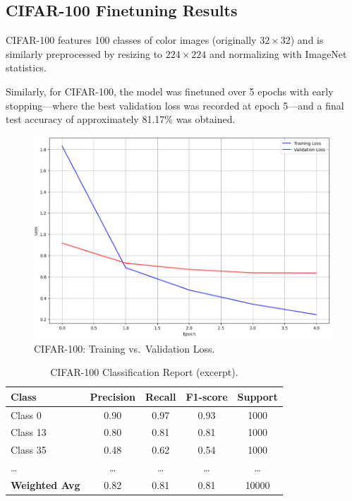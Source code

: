 \documentclass[conference]{IEEEtran}
\begin{document}
\subsection{CIFAR-100 Finetuning Results}
CIFAR-100 features 100 classes of color images (originally $32\times32$)
\cite{cifar} and is similarly preprocessed by resizing to $224\times224$ and
normalizing with ImageNet statistics.

Similarly, for CIFAR-100, the model was finetuned
over 5 epochs with early stopping—where the best validation loss was recorded
at epoch 5—and a final test accuracy of approximately 81.17\% was obtained.

\begin{figure}[H]
    \centering
    \includegraphics[width=0.55\linewidth]{cifar100_train_val_loss.png}
    \caption{CIFAR-100: Training vs.\ Validation Loss.}
    \label{fig:cifar100_loss}
\end{figure}

\begin{table}[H]
    \centering
    \scriptsize
    \begin{tabular}{lcccc}
        \toprule
        \textbf{Class}        & \textbf{Precision} & \textbf{Recall} & \textbf{F1-score} & \textbf{Support} \\
        \midrule
        Class 0               & 0.90               & 0.97            & 0.93              & 1000             \\
        Class 13              & 0.80               & 0.81            & 0.81              & 1000             \\
        Class 35              & 0.48               & 0.62            & 0.54              & 1000             \\
        \ldots                & \ldots             & \ldots          & \ldots            & \ldots           \\
        \midrule
        \textbf{Weighted Avg} & 0.82               & 0.81            & 0.81              & 10000            \\
        \bottomrule
    \end{tabular}
    \caption{CIFAR-100 Classification Report (excerpt).}
    \label{tab:cifar100_report}
\end{table}
\end{document}
